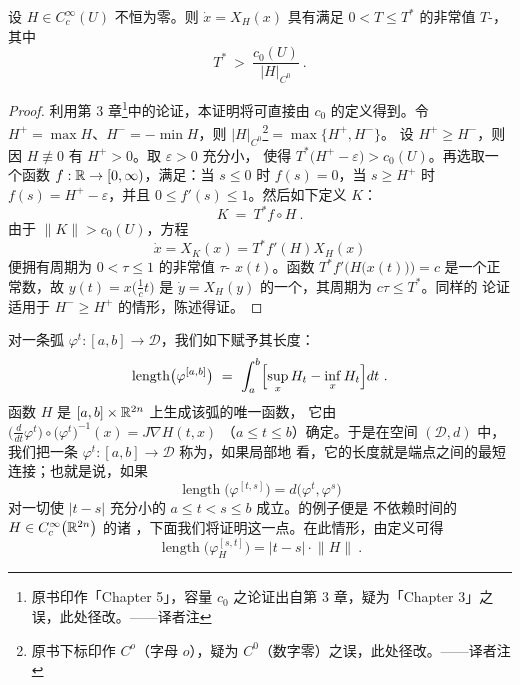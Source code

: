 \begin{theorem}\label{thm:fast-periodic-solutions}
设 $H\in C^{\infty}_{c}(U)$ 不恒为零。则\trHamiltonianSystem{} $\dot{x}=X_{H}(x)$%
具有满足 $0<T\leq T^{*}$ 的非常值 $T$-\trPeriodicSolution，其中
\[
T^{*}\ >\ \frac{c_{0}(U)}{\lvert H\rvert_{C^{0}}}\ .
\]
\end{theorem}

\begin{proof}
利用第 3 章\footnote{原书印作「Chapter 5」，容量 $c_{0}$ 之论证出自第 3 章，疑为「Chapter 3」之误，此处径改。——译者注}中的论证，本证明将可直接由\trCapacity{} $c_{0}$ 的定义得到。令%
$H^{+}=\max H$、$H^{-}=-\min H$，则 $\lvert H\rvert_{C^{0}}$\footnote{原书下标印作 $C^{o}$（字母 $o$），疑为 $C^{0}$（数字零）之误，此处径改。——译者注}$=\max\bigl\{H^{+},H^{-}\bigr\}$。%
设 $H^{+}\geq H^{-}$，则因 $H\not\equiv0$ 有 $H^{+}>0$。取 $\varepsilon>0$ 充分小，%
使得 $T^{*}\bigl(H^{+}-\varepsilon\bigr)>c_{0}(U)$。再选取一个\trSmooth{}函数%
$f:\mathbb{R}\to[0,\infty)$，满足：当 $s\leq0$ 时 $f(s)=0$，当 $s\geq H^{+}$ 时%
$f(s)=H^{+}-\varepsilon$，并且 $0\leq f'(s)\leq1$。然后如下定义%
\trHamiltonianFunction{} $K$：
\[
K\ =\ T^{*}f\circ H\ .
\]
由于 $\lVert K\rVert>c_{0}(U)$，方程
\[
\dot{x}=X_{K}(x)=T^{*}f'(H)X_{H}(x)
\]
便拥有周期为 $0<\tau\leq1$ 的非常值 $\tau$-\trPeriodicSolution{} $x(t)$。函数%
$T^{*}f'\bigl(H\bigl(x(t)\bigr)\bigr)=c$ 是一个正常数，故 $y(t)=x\bigl(\tfrac{1}{c}t\bigr)$%
是 $\dot{y}=X_{H}(y)$ 的一个\trPeriodicSolution，其周期为 $c\tau\leq T^{*}$。同样的%
论证适用于 $H^{-}\geq H^{+}$ 的情形，陈述得证。
\end{proof}

对一条\trSmooth{}弧 $\varphi^{t}:[a,b]\to\mathcal{D}$，我们如下赋予其长度：
\[
\operatorname{length}\bigl(\varphi^{[a,b]}\bigr)\ =\ \int_{a}^{b}\Bigl[\sup_{x}H_{t}-%
\inf_{x}H_{t}\Bigr]dt\ .
\]
函数 $H$ 是 $[a,b]\times\mathbb{R}^{2n}$ 上生成该弧的唯一\trCompactSupport\trSmooth{}函数，%
它由 $\bigl(\frac{d}{dt}\varphi^{t}\bigr)\circ\bigl(\varphi^{t}\bigr)^{-1}(x)=J\nabla H(t,x)$%
（$a\leq t\leq b$）确定。于是在\trMetric{}空间 $(\mathcal{D},d)$ 中，我们把一条%
\trSmooth\trPath{} $\varphi^{t}:[a,b]\to\mathcal{D}$ 称为\trGeodesic，如果局部地%
看，它的长度就是端点之间的最短连接；也就是说，如果
\[
\operatorname{length}\bigl(\varphi^{[t,s]}\bigr)=d\bigl(\varphi^{t},\varphi^{s}\bigr)
\]
对一切使 $\lvert t-s\rvert$ 充分小的 $a\leq t<s\leq b$ 成立。\trGeodesic{}的例子便是%
不依赖时间的\trHamiltonianFunction{} $H\in C^{\infty}_{c}\bigl(\mathbb{R}^{2n}\bigr)$ 的诸%
\trFlow，下面我们将证明这一点。在此情形，由定义可得
\[
\operatorname{length}\bigl(\varphi_{H}^{[s,t]}\bigr)=\lvert t-s\rvert\cdot\lVert H\rVert\ .
\]

